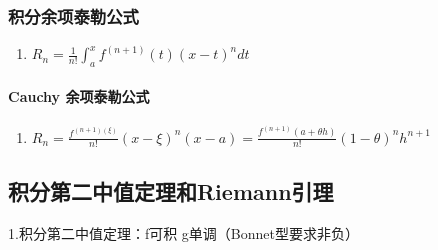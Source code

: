 \documentclass[
]{article}
\begin{document}
\hypertarget{ux79efux5206ux4f59ux9879ux6cf0ux52d2ux516cux5f0f}{%
\subsubsection{积分余项泰勒公式}\label{ux79efux5206ux4f59ux9879ux6cf0ux52d2ux516cux5f0f}}

\begin{enumerate}
\def\labelenumi{\arabic{enumi}.}
\item
  \(R_n= \frac{1}{n!}\int_a^xf^{(n+1)}(t)(x-t)^ndt\)
\end{enumerate}

\hypertarget{cauchy-ux4f59ux9879ux6cf0ux52d2ux516cux5f0f}{%
\paragraph{Cauchy
余项泰勒公式}\label{cauchy-ux4f59ux9879ux6cf0ux52d2ux516cux5f0f}}

\begin{enumerate}
\def\labelenumi{\arabic{enumi}.}
\item
  \(R_n=\frac{f^{(n+1)(\xi)}}{n!}(x-\xi)^n(x-a)=\frac{f^{(n+1)}(a+\theta h)}{n!}(1-\theta)^nh^{n+1}\)
\end{enumerate}

\hypertarget{ux79efux5206ux7b2cux4e8cux4e2dux503cux5b9aux7406ux548criemannux5f15ux7406}{%
\subsection{积分第二中值定理和Riemann引理}\label{ux79efux5206ux7b2cux4e8cux4e2dux503cux5b9aux7406ux548criemannux5f15ux7406}}

1.积分第二中值定理：f可积 g单调（Bonnet型要求非负）
\end{document}
